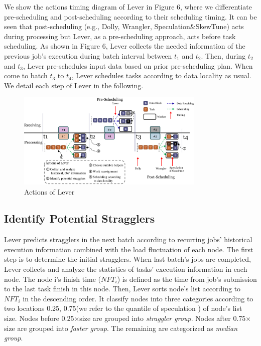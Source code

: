 \documentclass[10pt,conference,compsocconf,letterpaper]{IEEEtran}
\begin{document}
  We show the actions timing diagram of Lever in Figure 6, where we differentiate pre-scheduling and post-scheduling according to their scheduling timing. It can be seen that post-scheduling (e.g., Dolly, Wrangler, Speculation\&SkewTune) acts during processing but Lever, as a pre-scheduling approach, acts before task scheduling. As shown in Figure 6, Lever collects the needed information of the previous job's execution during batch interval between $t_1$ and $t_2$.
  Then, during $t_2$ and $t_3$, Lever pre-schedules input data based on prior pre-scheduling plan. When come to batch $t_3$ to $t_4$, Lever schedules tasks according to data locality as usual. We detail each step of Lever in the following.
  \begin{figure}[htbp]
    \centering
    \includegraphics[width=0.8\textwidth]{FigureAction}
    \caption{Actions of Lever}
    \label{Fig. 6:}
  \end{figure}

\subsection{Identify Potential Stragglers}

  Lever predicts stragglers in the next batch according to recurring jobs' historical execution information combined with the load fluctuation of each node. The first step is to determine the initial stragglers. When last batch's jobs are completed, Lever collects and analyze the statistics of tasks' execution information in each node. The node i's finish time ($NFT_i$) is defined as the time from job's submission to the last task finish in this node. Then, Lever sorts node's list according to $NFT_i$ in the descending order. It classify nodes into three categories according to two locations 0.25, 0.75(we refer to the quantile of speculation \cite{Dean2004}) of node's list size. Nodes before 0.25$\times$size are grouped into \emph{straggler group}. Nodes after 0.75$\times$size are grouped into \emph{faster group}. The remaining are categorized as \emph{median group}.
\end{document}
